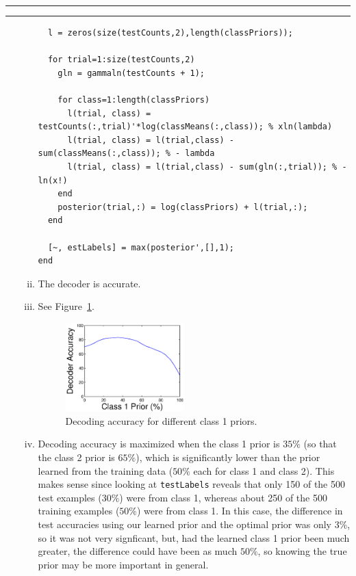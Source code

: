 \documentclass[11pt]{article}
\newcounter{questionCounter}
\newcounter{partCounter}[questionCounter]
\newenvironment{question}[2][\arabic{questionCounter}]{%
    \setcounter{partCounter}{0}%
    \vspace{.25in} \hrule \vspace{0.5em}%
        \noindent{\bf #2}%
    \vspace{0.8em} \hrule \vspace{.10in}%
    \addtocounter{questionCounter}{1}%
}{}
\newcommand{\ans}[1]{\mbox{\fbox{$\displaystyle #1$}}} %
\begin{document}
\begin{question}{Problem 3}
\begin{enumerate}[A)]
\begin{enumerate}[i)]
{\begin{verbatim}
  l = zeros(size(testCounts,2),length(classPriors));

  for trial=1:size(testCounts,2)
    gln = gammaln(testCounts + 1);

    for class=1:length(classPriors)
      l(trial, class) = testCounts(:,trial)'*log(classMeans(:,class)); % xln(lambda)
      l(trial, class) = l(trial,class) - sum(classMeans(:,class)); % - lambda
      l(trial, class) = l(trial,class) - sum(gln(:,trial)); % - ln(x!)
    end
    posterior(trial,:) = log(classPriors) + l(trial,:);
  end

  [~, estLabels] = max(posterior',[],1);
end
\end{verbatim}
}

\item The decoder is \ans{80.2\%} accurate.

\item
See Figure~\ref{fig:3Biv}.
\begin{figure}[h]
\begin{center}
\includegraphics[width=0.46\textwidth]{3Biv}
\end{center}
\caption{Decoding accuracy for different class 1 priors.}
\label{fig:3Biv}
\end{figure}

\item Decoding accuracy is maximized when the class 1 prior is $35\%$ (so that
the class 2 prior is $65\%$), which is significantly lower than the prior
learned from the training data ($50\%$ each for class 1 and class 2). This
makes sense since looking at \texttt{testLabels} reveals that only 150 of the
500 test examples ($30\%$) were from class 1, whereas about 250 of the 500
training examples ($50\%$) were from class 1. In this case, the difference in
test accuracies using our learned prior and the optimal prior was only $3\%$,
so it was not very signficant, but, had the learned class 1 prior been much
greater, the difference could have been as much $50\%$, so knowing the true
prior may be more important in general.


\end{enumerate}
\end{enumerate}
\end{question}
\end{document}
